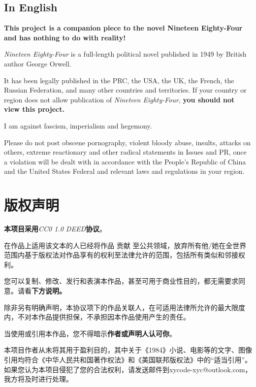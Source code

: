 \documentclass[lang=cn, color=black, chinesefont=founder]{elegantbook}
\begin{document}
            \section*{In English}
                \textbf{This project is a companion piece to the novel Nineteen Eighty-Four and has nothing to do with reality!}

                \textit{Nineteen Eighty-Four} is a full-length political novel published in 1949 by British author George Orwell.

                It has been legally published in the PRC, the USA, the UK, the French, the Russian Federation, and many other countries and territories. If your country or region does not allow publication of \textit{Nineteen Eighty-Four}, \textbf{you should not view this project.}

                I am against fascism, imperialism and hegemony.

                Please do not post obscene pornography, violent bloody abuse, insults, attacks on others, extreme reactionary and other radical statements in Issues and PR, once a violation will be dealt with in accordance with the People's Republic of China and the United States Federal and relevant laws and regulations in your region.
    
        \chapter*{版权声明}
            \begin{center}
                \large
                \textbf{本项目采用}\textit{CC0 1.0 DEED}\textbf{协议}。
            \end{center}

            在作品上适用该文本的人已经将作品 贡献 至公共领域，放弃所有他/她在全世界范围内基于版权法对作品享有的权利至法律允许的范围，包括所有类似和邻接权利。

            您可以复制、修改、发行和表演本作品，甚至可用于商业性目的，都无需要求同意。请看\textbf{下方说明。}

            除非另有明确声明，本协议项下的作品关联人，在可适用法律所允许的最大限度内，不对本作品提供担保，不承担因本作品使用产生的责任。

            当使用或引用本作品，您不得暗示\textbf{作者或声明人认可你}。

            本项目作者从未将其用于盈利目的，其中关于《1984》小说、电影等的文字、图像引用均符合《中华人民共和国著作权法》和《美国联邦版权法》中的“适当引用”。如果您认为本项目侵犯了您的合法权利，请发送邮件到xycode-xyc@outlook.com，我方将及时进行处理。
        
\end{document}
